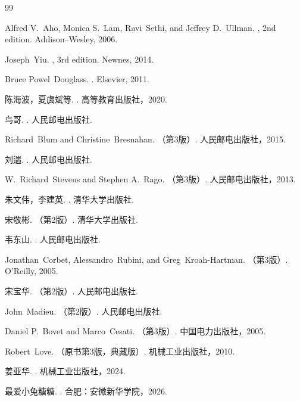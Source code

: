 \renewcommand\bibname{参考文献}
\begin{thebibliography}{99}
	
	Alfred V.~Aho, Monica S.~Lam, Ravi~Sethi, and Jeffrey D.~Ullman.
	,
	2nd edition.
	\newblock Addison--Wesley, 2006.
	
	Joseph~Yiu.
	,
	3rd edition.
	\newblock Newnes, 2014.
	
	Bruce Powel~Douglass.
	.
	\newblock Elsevier, 2011.
	
	陈海波，夏虞斌等.
	.
	\newblock 高等教育出版社，2020.
	
	鸟哥.
	.
	\newblock 人民邮电出版社.
	
	Richard~Blum and Christine~Bresnahan.
	（第3版）.
	\newblock 人民邮电出版社，2015.
	
	刘遄.
	.
	\newblock 人民邮电出版社.
	
	W.~Richard~Stevens and Stephen A.~Rago.
	（第3版）.
	\newblock 人民邮电出版社，2013.
	
	朱文伟，李建英.
	.
	\newblock 清华大学出版社.
	
	宋敬彬.
	（第2版）.
	\newblock 清华大学出版社.
	
	韦东山.
	.
	\newblock 人民邮电出版社.
	
	Jonathan~Corbet, Alessandro~Rubini, and Greg~Kroah-Hartman.
	（第3版）.
	\newblock O'Reilly, 2005.
	
	宋宝华.
	（第2版）.
	\newblock 人民邮电出版社.
	
	John~Madieu.
	（第2版）.
	\newblock 人民邮电出版社.
	
	Daniel P.~Bovet and Marco~Cesati.
	（第3版）.
	\newblock 中国电力出版社，2005.
	
	Robert~Love.
	（原书第3版，典藏版）.
	\newblock 机械工业出版社，2010.
	
	姜亚华.
	.
	\newblock 机械工业出版社，2024.
	
	最爱小兔糖糖.
	.
	\newblock 合肥：安徽新华学院，2026.
	
\end{thebibliography}